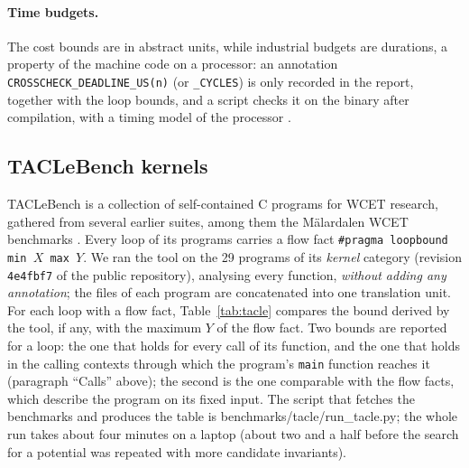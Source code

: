\documentclass[oneside,english]{amsart}
\numberwithin{equation}{section}
\numberwithin{figure}{section}
\theoremstyle{plain}
\theoremstyle{definition}
\theoremstyle{plain}
\theoremstyle{remark}
\theoremstyle{plain}
\theoremstyle{definition}
\theoremstyle{plain}
\theoremstyle{remark}
\newcommand{\lean}[1]{{\ttfamily\small #1}}
\begin{document}
\paragraph{Time budgets.}
The cost bounds are in abstract units, while industrial budgets are durations, a property of the machine code on a processor: an annotation \texttt{CROSSCHECK\_DEADLINE\_US(n)} (or \texttt{\_CYCLES}) is only recorded in the report, together with the loop bounds, and a script checks it on the binary after compilation, with a timing model of the processor \cite{crosscheckBinary}.

\subsection{TACLeBench kernels}
\label{subsec:tacle}

TACLeBench \cite{falk2016taclebench} is a collection of self-contained C programs for WCET research, gathered from several earlier suites, among them the M\"alardalen WCET benchmarks \cite{gustafsson2010malardalen}. Every loop of its programs carries a flow fact \texttt{\#pragma loopbound min $X$ max $Y$}. We ran the tool on the 29 programs of its \emph{kernel} category (revision \texttt{4e4fbf7} of the public repository), analysing every function, \emph{without adding any annotation}; the files of each program are concatenated into one translation unit. For each loop with a flow fact, Table~\ref{tab:tacle} compares the bound derived by the tool, if any, with the maximum $Y$ of the flow fact. Two bounds are reported for a loop: the one that holds for every call of its function, and the one that holds in the calling contexts through which the program's \texttt{main} function reaches it (paragraph ``Calls'' above); the second is the one comparable with the flow facts, which describe the program on its fixed input. The script that fetches the benchmarks and produces the table is \lean{benchmarks/tacle/run\_tacle.py}; the whole run takes about four minutes on a laptop (about two and a half before the search for a potential was repeated with more candidate invariants).
\end{document}
